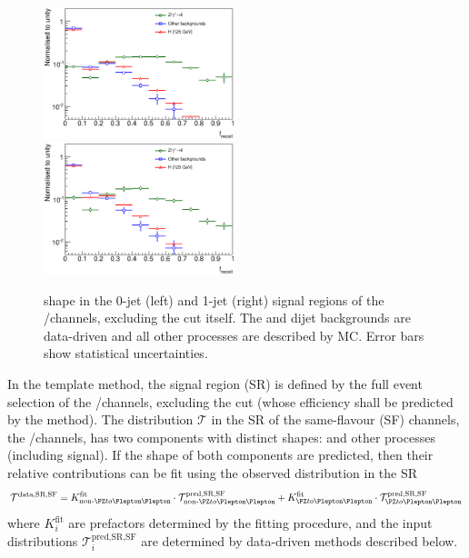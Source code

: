 \begin{figure}[t]
	\includegraphics[width=0.495\textwidth]{tex/backgrounds/frecoil_0jet}
	\hfill
	\includegraphics[width=0.495\textwidth]{tex/backgrounds/frecoil_1jet}
	\caption{\frecoil shape in the 0-jet (left) and 1-jet (right) signal regions of the 
	\eech/\mmch channels, excluding the \frecoil cut itself. The \Wjets and dijet 
	backgrounds are data-driven and all other processes are described by MC. Error bars 
	show statistical uncertainties.}
	\label{fig:dy:frecoil_shape}
\end{figure}

In the template method, the signal region (SR) is defined by the full event selection of 
the \eech/\mmch channels, excluding the \frecoil cut (whose efficiency shall be predicted 
by the method). The \frecoil distribution $\mathcal{T}$ in the SR of the same-flavour 
(SF) channels, \ie the \eech/\mmch channels, has two components with distinct shapes: 
\DYll and other processes (including signal). If the shape of both components are 
predicted, then their relative contributions can be fit using the observed \frecoil 
distribution in the SR
\begin{equation}
	\mathcal{T}^{\text{data,SR,SF}} = K^{\text{fit}}_{\text{non-}\HepProcess{\PZ\HepTo\Plepton\Plepton}} \cdot \mathcal{T}^{\text{pred,SR,SF}}_{\text{non-}\HepProcess{\PZ\HepTo\Plepton\Plepton}} + K^{\text{fit}}_{\HepProcess{\PZ\HepTo\Plepton\Plepton}} \cdot \mathcal{T}^{\text{pred,SR,SF}}_{\HepProcess{\PZ\HepTo\Plepton\Plepton}}
	\label{eq:dy:pacman_basic}
\end{equation}
where $K^{\text{fit}}_{i}$ are prefactors determined by the fitting procedure, and the 
input distributions $\mathcal{T}^{\text{pred,SR,SF}}_{i}$ are determined by data-driven 
methods described below.

